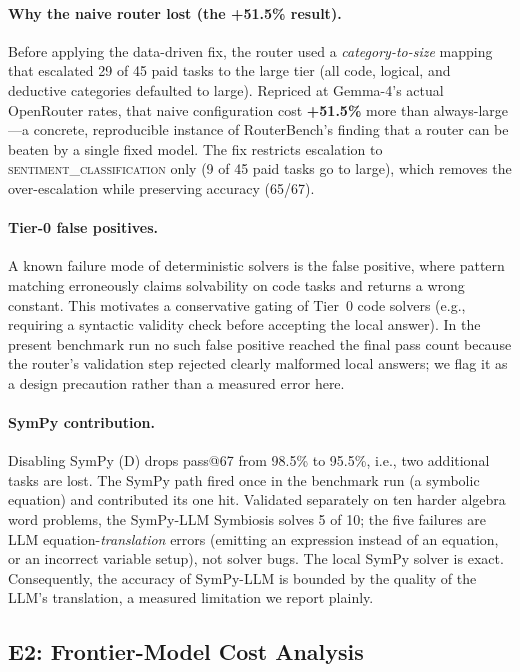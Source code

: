 \documentclass[11pt]{article}
\begin{document}
\paragraph{Why the naive router lost (the +51.5\% result).}
Before applying the data-driven fix, the router used a \emph{category-to-size} mapping
that escalated 29 of 45 paid tasks to the large tier (all code, logical, and deductive
categories defaulted to large). Repriced at Gemma-4's actual OpenRouter rates, that naive
configuration cost \textbf{+51.5\%} more than always-large---a concrete, reproducible
instance of RouterBench's finding that a router can be beaten by a single fixed model. The
fix restricts escalation to \textsc{sentiment\_classification} only (9 of 45 paid tasks go
to large), which removes the over-escalation while preserving accuracy (65/67).

\paragraph{Tier-0 false positives.}
A known failure mode of deterministic solvers is the false positive, where pattern matching
erroneously claims solvability on code tasks and returns a wrong constant. This motivates a
conservative gating of Tier~0 code solvers (e.g., requiring a syntactic validity check before
accepting the local answer). In the present benchmark run no such false positive reached the
final pass count because the router's validation step rejected clearly malformed local
answers; we flag it as a design precaution rather than a measured error here.

\paragraph{SymPy contribution.}
Disabling SymPy (\textsc{D}) drops pass@67 from 98.5\% to 95.5\%, i.e., two additional tasks are lost. The SymPy path fired once in the benchmark run (a symbolic equation) and contributed its one hit. Validated separately on ten harder algebra word problems, the SymPy-LLM Symbiosis solves 5 of 10; the five failures are LLM equation-\emph{translation} errors (emitting an expression instead of an equation, or an incorrect variable setup), not solver bugs. The local SymPy solver is exact. Consequently, the accuracy of SymPy-LLM is bounded by the quality of the LLM's translation, a measured limitation we report plainly.

\subsection{E2: Frontier-Model Cost Analysis}
\label{sec:cost}
\end{document}
